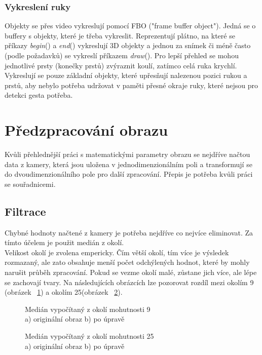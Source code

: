 \subsubsection{Vykreslení ruky}
Objekty se přes video vykreslují pomocí FBO ("frame buffer object"). Jedná se o buffery s objekty, které je třeba vykreslit. Reprezentují plátno, na které se příkazy \textit{begin}() a \textit{end}() vykreslují 3D objekty a jednou za snímek či méně často (podle požadavků) se vykreslí příkazem \textit{draw}(). Pro lepší přehled se mohou jednotlivé prsty (konečky prstů) zvýraznit koulí, zatímco celá ruka krychlí. Vykreslují se pouze základní objekty, které upřesňují nalezenou pozici rukou a prstů, aby nebylo potřeba udržovat v paměti přesné okraje ruky, které nejsou pro detekci gesta potřeba.

\section{Předzpracování obrazu}

Kvůli přehlednější práci s matematickými parametry obrazu se nejdříve načtou data z kamery, která jsou uložena v jednodimenzionálním poli a transformují se do dvoudimenzionálního pole pro další zpracování. Přepis je potřeba kvůli práci se souřadnicemi.\\

\subsection{Filtrace}
Chybné hodnoty načtené z kamery je potřeba nejdříve co nejvíce eliminovat. Za tímto účelem je použit medián z okolí.\\

Velikost okolí je zvolena empericky. Čím větší okolí, tím více je výsledek rozmazaný, ale zato obsahuje menší počet odchýlených hodnot, které by mohly narušit průběh zpracování. Pokud se vezme okolí malé, zůstane jich více, ale lépe se zachovají tvary. Na následujících obrázcích lze pozorovat rozdíl mezi okolím 9 (obrázek ~\ref{pic10}) a okolím 25(obrázek ~\ref{pic11}).\\

\begin{figure}[htp]
\centering
{} \hfil
{}
\caption{Medián vypočítaný z okolí mohutnosti 9 \\ a) originální obraz b) po úpravě}
\label{pic10}
\end{figure}
\begin{figure}[htp]
\centering
{} \hfil
{}
\caption{Medián vypočítaný z okolí mohutnosti 25 \\ a) originální obraz b) po úpravě}
\label{pic11}
\end{figure}

